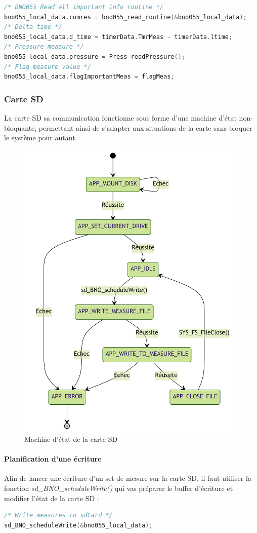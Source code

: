 {	\begin{lstlisting}[frame=single, language=C, caption={Code lecture des données par la librairie}, captionpos=b, breaklines=true]
/* BNO055 Read all important info routine */
bno055_local_data.comres = bno055_read_routine(&bno055_local_data);
/* Delta time */
bno055_local_data.d_time = timerData.TmrMeas - timerData.ltime;
/* Pressure measure */
bno055_local_data.pressure = Press_readPressure();
/* Flag measure value */
bno055_local_data.flagImportantMeas = flagMeas;
	\end{lstlisting}

	\subsubsection{Carte SD}
	La carte SD sa communication fonctionne sous forme d'une machine d'état non-bloquante, permettant ainsi de s'adapter aux situations de la carte sans bloquer le système pour autant.
	
	\begin{figure}[h]
		\centering
		\includegraphics[width=0.6\linewidth]{Figures/Dev-SOFT/mermaid-diagram-2023-06-14-162436}
		\caption{Machine d'état de la carte SD}
		\label{fig:mermaid-diagram-2023-06-14-162436}
	\end{figure}

	\clearpage
	
	\paragraph{Planification d'une écriture}
	Afin de lancer une écriture d'un set de mesure sur la carte SD, il faut utiliser la fonction \textit{sd\_BNO\_scheduleWrite()} qui vas préparer le buffer d'écriture et modifier l'état de la carte SD : 
	\begin{lstlisting}[frame=single, language=C, caption={Lancement d'une écriture sur la carte SD}, captionpos=b, breaklines=true]
/* Write measures to sdCard */
sd_BNO_scheduleWrite(&bno055_local_data);
	\end{lstlisting}
	
	
	
	
	
	
	
	
	\clearpage
	

}
